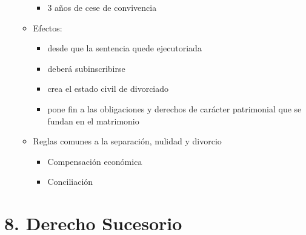 \documentclass[]{article}
\providecommand{\tightlist}{%
  \setlength{\itemsep}{0pt}\setlength{\parskip}{0pt}}
\begin{document}
\begin{itemize}
\begin{itemize}
    \begin{itemize}
    \tightlist
    \item
      3 años de cese de convivencia
    \end{itemize}
  \item
    Efectos:

    \begin{itemize}
    \tightlist
    \item
      desde que la sentencia quede ejecutoriada
    \item
      deberá subinscribirse
    \item
      crea el estado civil de divorciado
    \item
      pone fin a las obligaciones y derechos de carácter patrimonial que
      se fundan en el matrimonio
    \end{itemize}
  \item
    Reglas comunes a la separación, nulidad y divorcio

    \begin{itemize}
    \tightlist
    \item
      Compensación económica
    \item
      Conciliación
    \end{itemize}
  \end{itemize}
\end{itemize}

\hypertarget{derecho-sucesorio}{%
\section{8. Derecho Sucesorio}\label{derecho-sucesorio}}
\end{document}
